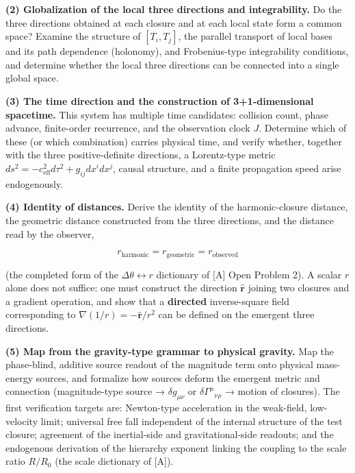 \documentclass[
  a4paper,
]{article}
\begin{document}
\textbf{(2) Globalization of the local three directions and
integrability.} Do the three directions obtained at each closure and at
each local state form a common space? Examine the structure of
\([T_i,T_j]\), the parallel transport of local bases and its path
dependence (holonomy), and Frobenius-type integrability conditions, and
determine whether the local three directions can be connected into a
single global space.

\textbf{(3) The time direction and the construction of 3+1-dimensional
spacetime.} This system has multiple time candidates: collision count,
phase advance, finite-order recurrence, and the observation clock \(J\).
Determine which of these (or which combination) carries physical time,
and verify whether, together with the three positive-definite
directions, a Lorentz-type metric
\(ds^2=-c_{\mathrm{eff}}^2 d\tau^2+g_{ij}dx^i dx^j\), causal structure,
and a finite propagation speed arise endogenously.

\textbf{(4) Identity of distances.} Derive the identity of the
harmonic-closure distance, the geometric distance constructed from the
three directions, and the distance read by the observer,

\[
r_{\mathrm{harmonic}}=r_{\mathrm{geometric}}=r_{\mathrm{observed}}
\]

(the completed form of the \(\Delta\theta\leftrightarrow r\) dictionary
of {[}A{]} Open Problem 2). A scalar \(r\) alone does not suffice: one
must construct the direction \(\hat{\mathbf r}\) joining two closures
and a gradient operation, and show that a \textbf{directed}
inverse-square field corresponding to
\(\nabla(1/r)=-\hat{\mathbf r}/r^2\) can be defined on the emergent
three directions.

\textbf{(5) Map from the gravity-type grammar to physical gravity.} Map
the phase-blind, additive source readout of the magnitude term onto
physical mass-energy sources, and formalize how sources deform the
emergent metric and connection (magnitude-type source →
\(\delta g_{\mu\nu}\) or \(\delta\Gamma^\mu{}_{\nu\rho}\) → motion of
closures). The first verification targets are: Newton-type acceleration
in the weak-field, low-velocity limit; universal free fall independent
of the internal structure of the test closure; agreement of the
inertial-side and gravitational-side readouts; and the endogenous
derivation of the hierarchy exponent linking the coupling to the scale
ratio \(R/R_0\) (the scale dictionary of {[}A{]}).
\end{document}
